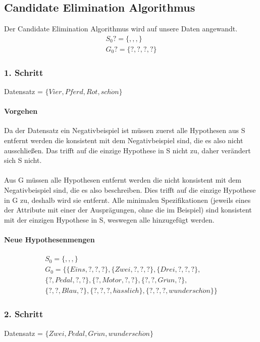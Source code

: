\documentclass[a4paper]{article}
\begin{document}
\subsection{Candidate Elimination Algorithmus}
Der Candidate Elimination Algorithmus wird auf unsere Daten angewandt.
\begin{align*}
	S_0 ?= \{,,,\} \\
	G_0 ?= \{?,?,?,?\}
\end{align*}

\subsubsection{1. Schritt}
Datensatz = $ \{Vier, Pferd, Rot, sch\ddot{o}n\} $
\paragraph{Vorgehen}
Da der Datensatz ein Negativbeispiel ist müssen zuerst alle Hypothesen aus S entfernt werden die konsistent mit dem Negativbeispiel sind, die es also nicht ausschließen. Das trifft auf die einzige Hypothese in S nicht zu, daher verändert sich S nicht.
\paragraph{}
Aus G müssen alle Hypothesen entfernt werden die nicht konsistent mit dem Negativbeispiel sind, die es also beschreiben. Dies trifft auf die einzige Hypothese in G zu, deshalb wird sie entfernt. Alle minimalen Spezifikationen (jeweils eines der Attribute mit einer der Ausprägungen, ohne die im Beispiel) sind konsistent mit der einzigen Hypothese in S, weswegen alle hinzugefügt werden.
\paragraph{Neue Hypothesenmengen}
\begin{align*}
	S_0 = \{,,,\} \\
	G_0 = \{ \{Eins,?,?,?\}, \{Zwei,?,?,?\}, \{Drei,?,?,?\}, \\
	\{?,Pedal,?,?\}, \{?,Motor,?,?\}, \{?,?,Gr\ddot{u}n,?\}, \\ 
	\{?,?,Blau,?\}, \{?,?,?,h\ddot{a}sslich\}, \{?,?,?,wundersch\ddot{o}n\} \}
\end{align*}

\subsubsection{2. Schritt}
Datensatz = $ \{Zwei, Pedal, Gr\ddot{u}n, wundersch\ddot{o}n\} $
\end{document}
